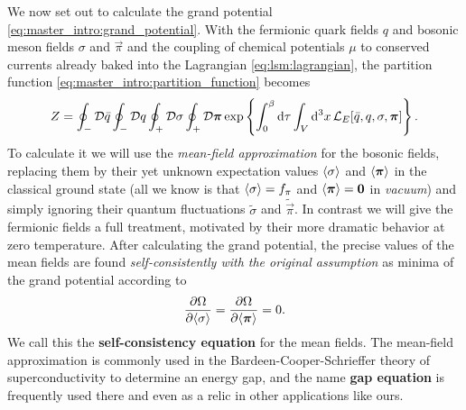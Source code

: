 We now set out to calculate the grand potential \eqref{eq:master_intro:grand_potential}.
With the fermionic quark fields $q$ and bosonic meson fields $\sigma$ and $\vec\pi$
and the coupling of chemical potentials $\mu$ to conserved currents already baked into the Lagrangian \eqref{eq:lsm:lagrangian},
the partition function \eqref{eq:master_intro:partition_function} becomes
\begin{equation}
	Z = \oint_- \mathcal{D} \bar{q} \oint_- \mathcal{D} q \oint_+ \mathcal{D} \sigma \oint_+ \mathcal{D} {\bm{\pi}} \exp \left\{ \int_0^\beta \mathop{}\!\mathrm{d} \tau \int_V \mathop{}\!\mathrm{d}^3 x \, \mathcal{L}_E[\bar{q}, q, \sigma, {\bm{\pi}}]  \right\} .
\end{equation}
To calculate it we will use the \emph{mean-field approximation} for the bosonic fields,
replacing them by their yet unknown expectation values $\langle \sigma \rangle$ and $\langle {\bm{\pi}} \rangle$ in the classical ground state
(all we know is that $\langle \sigma \rangle=f_\pi$ and $\langle {\bm{\pi}} \rangle={\bm{0}}$ in \emph{vacuum})
and simply ignoring their quantum fluctuations $\tilde{\sigma}$ and $\tilde{\vec\pi}$.
In contrast we will give the fermionic fields a full treatment,
motivated by their more dramatic behavior at zero temperature.
After calculating the grand potential,
the precise values of the mean fields are found \emph{self-consistently with the original assumption} as minima of the grand potential according to
\begin{equation}
	\pdv{\Omega}{ \langle \sigma \rangle} = \pdv{\Omega}{ \langle {\bm{\pi}} \rangle} = 0.
\label{eq:lsm:gap_equation}
\end{equation}
We call this the \textbf{self-consistency equation} for the mean fields.
The mean-field approximation is commonly used in the Bardeen-Cooper-Schrieffer theory of superconductivity to determine an energy gap,
and the name \textbf{gap equation} is frequently used there and even as a relic in other applications like ours.

